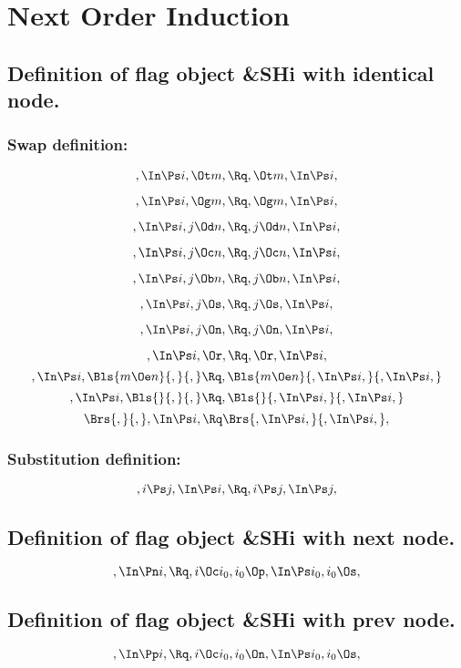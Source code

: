 
\chapter{Next Order Induction}
\section{Definition of flag object \&SHi with identical node.}


\subsection{Swap definition:}
\[,\In \Ps i, \Ot m, \Rq , \Ot m, \In \Ps i,\]

\[,\In \Ps i, \Og m, \Rq , \Og m, \In \Ps i,\]

\[,\In \Ps i, j \Od n, \Rq , j \Od n, \In \Ps i,\]

\[,\In \Ps i, j \Oc n, \Rq , j \Oc n, \In \Ps i,\]

\[,\In \Ps i, j \Ob n, \Rq , j \Ob n, \In \Ps i,\]

\[,\In \Ps i, j \Os, \Rq , j \Os, \In \Ps i,\]

\[,\In \Ps i, j \On, \Rq , j \On, \In \Ps i,\]

\[,\In \Ps i, \Or, \Rq , \Or, \In \Ps i,\]
\bigskip
\[,\In \Ps i, \Bls{m \Oe n}{,}{,} \Rq , \Bls{m \Oe n}{,\In \Ps i,}{,\In \Ps i,}\]
\bigskip
\[,\In \Ps i, \Bls{}{,}{,} \Rq , \Bls{}{,\In \Ps i,}{,\In \Ps i,}\]
\bigskip
\[ \Brs{,}{,},\In \Ps i, \Rq \Brs{,\In \Ps i,}{,\In \Ps i,},\]




\bigskip
\bigskip
\subsection{Substitution definition:}
\[,i \Ps j, \In \Ps i, \Rq , i\Ps j, \In \Ps j,\]



\bigskip
\bigskip
\bigskip
\bigskip
\section{Definition of flag object \&SHi with next node.}
\[, \In \Pn i, \Rq , i \Oc i_0, i_0 \Op, \In \Ps i_0, i_0 \Os,\]

\bigskip
\bigskip
\bigskip
\bigskip
\section{Definition of flag object \&SHi with prev node.}
\[, \In \Pp i, \Rq , i \Oc i_0, i_0 \On, \In \Ps i_0, i_0 \Os,\]


